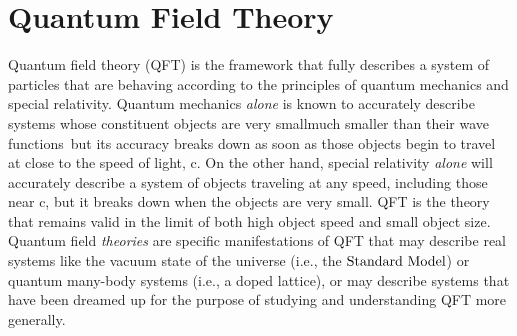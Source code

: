 \chapter{Quantum Field Theory}
\label{chap:QFT}

Quantum field theory (QFT) is the framework that fully describes a system of particles that are behaving according to the principles of quantum mechanics and special relativity. Quantum mechanics {\it alone} is known to accurately describe systems whose constituent objects are very small\textemdash much smaller than their wave functions~\cite{sakurai2011modern}\textemdash  but its accuracy breaks down as soon as those objects  begin to travel at close to the speed of light, c. On the other hand, special relativity {\it alone} will accurately describe a system of objects traveling at any speed, including those near c, but it breaks down when the objects are very small. QFT is the theory that remains valid in the limit of both high object speed and small object size. Quantum field {\it theories} are specific manifestations of QFT that may describe real systems like the vacuum state of the universe (i.e., the $\text{Standard\ Model}$) or quantum many-body systems (i.e., a doped lattice), or may describe systems that have been dreamed up for the purpose of studying and understanding QFT more generally.

